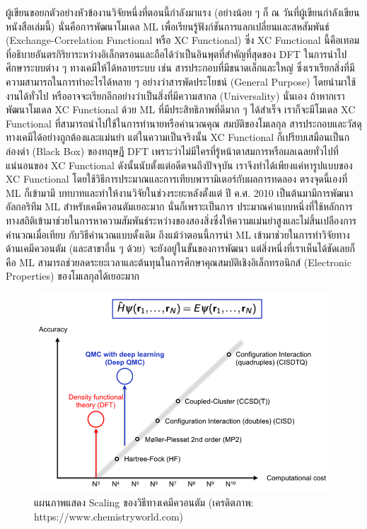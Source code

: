 ผู้เขียนขอยกตัวอย่างหัวข้องานวิจัยหนึ่งที่ตอนนี้กำลังมาแรง (อย่างน้อย ๆ ก็ ณ วันที่ผู้เขียนกำลังเขียนหนังสือเล่มนี้) นั่นคือการพัฒนาโมเดล ML 
เพื่อเรียนรู้ฟังก์ชันการแลกเปลี่ยนและสหสัมพันธ์ (Exchange-Correlation Functional หรือ XC Functional)\autocite{balabin2009a} 
ซึ่ง XC Functional นี้คือเทอมที่อธิบายอันตรกิริยาระหว่างอิเล็กตรอนและถือได้ว่าเป็นอินพุตที่สำคัญที่สุดของ DFT ในการนำไปศึกษาระบบต่าง ๆ 
ทางเคมีให้ได้หลายระบบ เช่น สารประกอบที่มีขนาดเล็กและใหญ่ ซึ่งเราเรียกสิ่งที่มีความสามารถในการทำอะไรได้หลาย ๆ อย่างว่าสารพัดประโยชน์ 
(General Purpose) โดยนำมาใช้งานได้ทั่วไป หรืออาจจะเรียกอีกอย่างว่าเป็นสิ่งที่มีความสากล (Universality) นั่นเอง ถ้าหากเราพัฒนาโมเดล 
XC Functional ด้วย ML ที่มีประสิทธิภาพที่ดีมาก ๆ ได้สำเร็จ เราก็จะมีโมเดล XC Functional ที่สามารถนำไปใช้ในการทำนายหรือคำนวณคุณ%
สมบัติของโมเลกุล สารประกอบและวัสดุทางเคมีได้อย่างถูกต้องและแม่นยำ แต่ในความเป็นจริงนั้น XC Functional ก็เปรียบเสมือนเป็นกล่องดำ 
(Black Box) ของทฤษฎี DFT เพราะว่าไม่มีใครที่รู้หน้าตาสมการหรือผลเฉลยทั่วไปที่แน่นอนของ XC Functional ดังนั้นนับตั้งแต่อดีตจนถึงปัจจุบัน 
เราจึงทำได้เพียงแค่หารูปแบบของ XC Functional โดยใช้วิธีการประมาณและการเทียบพารามิเตอร์กับผลการทดลอง ตรงจุดนี้เองที่ ML ก็เข้ามามี%
บทบาทและทำให้งานวิจัยในช่วงระยะหลังตั้งแต่ ปี ค.ศ. 2010 เป็นต้นมามีการพัฒนาอัลกอริทึม ML สำหรับเคมีควอนตัมเยอะมาก นั่นก็เพราะเป็นการ%
ประมาณค่าแบบหนึ่งที่ใช้หลักการทางสถิติเข้ามาช่วยในการหาความสัมพันธ์ระหว่างของสองสิ่งซึ่งให้ความแม่นยำสูงและไม่สิ้นเปลืองการคำนวณเมื่อเทียบ%
กับวิธีคำนวณแบบดั้งเดิม ถึงแม้ว่าตอนนี้การนำ ML เข้ามาช่วยในการทำวิจัยทางด้านเคมีควอนตัม (และสาขาอื่น ๆ ด้วย) จะยังอยู่ในขั้นของการพัฒนา 
แต่สิ่งหนึ่งที่เราเห็นได้ชัดเลยก็คือ ML สามารถช่วยลดระยะเวลาและต้นทุนในการศึกษาคุณสมบัติเชิงอิเล็กทรอนิกส์ (Electronic Properties) 
ของโมเลกุลได้เยอะมาก

\begin{figure}[htbp]
    \centering
    \includegraphics[width=0.9\linewidth]{fig/qm_scaling.png}
    \caption{แผนภาพแสดง Scaling ของวิธีทางเคมีควอนตัม (เครดิตภาพ: https://www.chemistryworld.com)}
    \label{fig:qm_scaling}
\end{figure}

